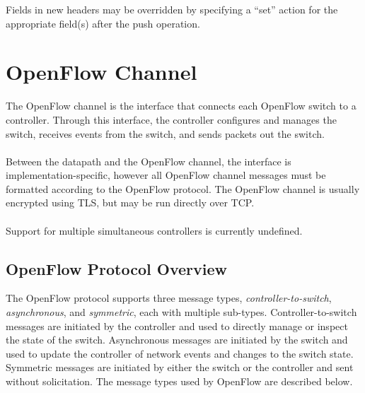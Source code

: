 \documentclass[10pt]{article}
\begin{document}
Fields in new headers may be overridden by specifying a ``set'' action for the appropriate field(s) after the push operation.

\section{OpenFlow Channel}
The OpenFlow channel is the interface that connects each OpenFlow switch to a controller.  Through this interface, the controller configures and manages the switch, receives events from the switch, and sends packets out the switch.
\\\\
Between the datapath and the OpenFlow channel, the interface is implementation-specific, however all OpenFlow channel messages must be formatted according to the OpenFlow protocol. The OpenFlow channel is usually encrypted using TLS, but may be run directly over TCP.
\\\\
Support for multiple simultaneous controllers is currently undefined.

\subsection{OpenFlow Protocol Overview}
The OpenFlow protocol supports three message types, \emph{controller-to-switch}, \emph{asynchronous}, and \emph{symmetric}, each with multiple sub-types.  Controller-to-switch messages are initiated by the controller and used to directly manage or inspect the state of the switch.  Asynchronous messages are initiated by the switch and used to update the controller of network events and changes to the switch state. Symmetric messages are initiated by either the switch or the controller and sent without solicitation.  The message types used by OpenFlow are described below.
\end{document}
